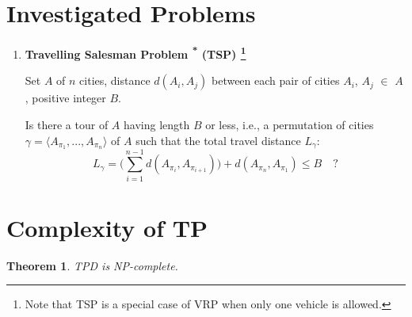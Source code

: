 \documentclass{mpaper}
\newtheorem{theorem}{Theorem}
\begin{document}








\appendix

\section{Investigated Problems}
\label{npcompleteproblems}

\begin{enumerate}
\item \textbf{Travelling Salesman Problem \textsuperscript{*} (TSP) \footnote{Note that TSP is a special case of VRP when only one vehicle is allowed.}}
\begin{instance}
Set $A$ of $n$ cities, distance $d(A_{i}, A_{j})$ between each pair of cities $A_{i}$, $A_{j}$ $\in$ $A$, positive integer $B$.
\end{instance}

\begin{question}
Is there a tour of $A$ having length $B$ or less, i.e., a permutation of cities $\gamma = \langle A_{\pi_{1}},...,A_{\pi_{n}} \rangle $ of $A$ such that the total travel distance $L_{\gamma}$:
$$L_{\gamma} = \bigg( \sum_{i=1}^{n-1} d(A_{\pi_{i}}, A_{\pi_{i+1}}) \bigg) + d(A_{\pi_{n}}, A_{\pi_{1}}) \leq B \quad \textrm{?}$$
\end{question}
\end{enumerate}

\section{Complexity of TP}
\label{appendix:tpcomplexity}
\begin{theorem}
TPD is NP-complete.
\end{theorem}
\end{document}
